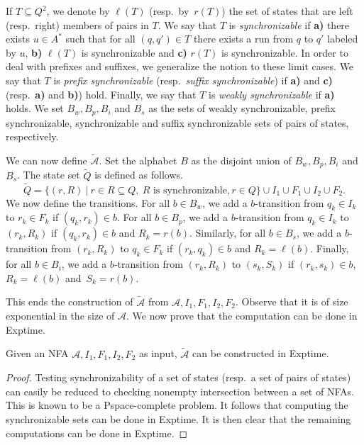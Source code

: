 \documentclass{LMCS}
\newcommand\As{\ensuremath{\mathcal{A}}\xspace}
\theoremstyle{plain}
\begin{document}
If $T \subseteq Q^2$, we denote by $\ell(T)$ (resp.\ by~$r(T)$) the set of
states that are left (resp.~right) members of pairs in $T$. We say that $T$ is
\emph{synchronizable} if {\bf a)} there exists $u \in A^*$ such that for all
$(q,q') \in T$ there exists a run from $q$ to $q'$ labeled by $u$, {\bf b)}
$\ell(T)$ is synchronizable and {\bf c)} $r(T)$ is synchronizable. In order to
deal with prefixes and suffixes, we generalize the notion to these limit
cases. We say that $T$ is \emph{prefix synchronizable} (resp.~\emph{suffix
  synchronizable}) if {\bf a)} and {\bf c)} (resp.~{\bf a)} and {\bf b)})
hold. Finally, we say that $T$ is \emph{weakly synchronizable} if {\bf a)} holds. We set $B_w,B_p,B_i$ and $B_s$ as the sets of weakly
synchronizable, prefix synchronizable, synchronizable and suffix
synchronizable sets of pairs of states, respectively.

We can now define $\widetilde{\As}$. Set the alphabet $B$ as the disjoint
union of $B_w,B_p,B_i$ and $B_s$. The state set $\widetilde{Q}$ is defined as follows.
\[
\widetilde{Q} = \{(r,R)\ |\ r \in R \subseteq Q,\ R \text{ is
  synchronizable}, r \in Q\} \cup I_1 \cup F_1\cup I_2 \cup F_2.
\] 
We now define the transitions. For all $b \in B_w$, we add a $b$-transition
from $q_k \in I_k$ to $r_k \in F_k$ if $(q_k,r_k) \in b$. For all $b \in B_p$,
we add a $b$-transition from $q_k \in I_k$ to $(r_k,R_k)$ if $(q_k,r_k) \in b$
and $R_k=r(b)$. Similarly, for all $b \in B_s$, we add a $b$-transition from
$(r_k,R_k)$ to $q_k \in F_k$ if $(r_k,q_k) \in b$ and $R_k =
\ell(b)$. Finally, for all $b \in B_i$, we add a $b$-transition from
$(r_k,R_k)$ to $(s_k,S_k)$ if $(r_k,s_k) \in b$, $R_k = \ell(b)$
and~$S_k=r(b)$.

\smallskip
This ends the construction of $\widetilde{\As}$ from $\As,I_1,F_1,I_2,F_2$. Observe that it is of size
exponential in the size of $\As$. We now prove that the
computation can be done in {\sc Exptime}.

\begin{lem} \label{lem:construc}
  Given an NFA  $\As,I_1,F_1,I_2,F_2$ as input, $\widetilde{\As}$ can be
  constructed in {\sc Exptime}.
\end{lem}

\begin{proof}
  Testing synchronizability of a set of states (resp.~a set of pairs
  of states) can easily be reduced to checking nonempty intersection
  between a set of NFAs. This is known to be a {\sc Pspace}-complete
  problem. It follows that computing the synchronizable sets can be
  done in {\sc Exptime}. It is then clear that the remaining
  computations can be done in {\sc Exptime}.
\end{proof}
\end{document}
